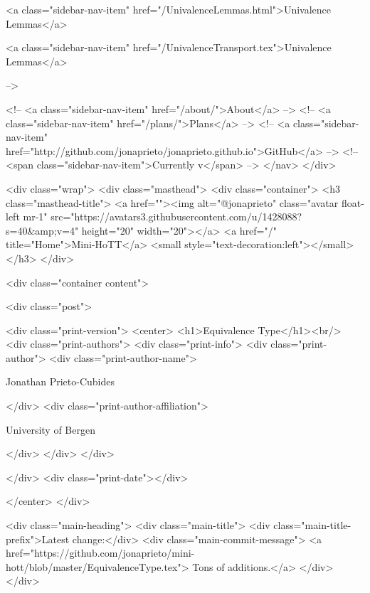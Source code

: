       
    
      
        
          <a class="sidebar-nav-item" href="/UnivalenceLemmas.html">Univalence Lemmas</a>
        
      
    
      
        
          <a class="sidebar-nav-item" href="/UnivalenceTransport.tex">Univalence Lemmas</a>
        
      
     -->

    <!-- <a class="sidebar-nav-item" href="/about/">About</a> -->
    <!-- <a class="sidebar-nav-item" href="/plans/">Plans</a> -->
    <!-- <a class="sidebar-nav-item" href="http://github.com/jonaprieto/jonaprieto.github.io">GitHub</a> -->
    <!-- <span class="sidebar-nav-item">Currently v</span> -->
  </nav>
</div>

    <div class="wrap">
      <div class="masthead">
        <div class="container">
          <h3 class="masthead-title">
            <a href=""><img alt="@jonaprieto" class="avatar float-left mr-1" src="https://avatars3.githubusercontent.com/u/1428088?s=40&amp;v=4" height="20" width="20"></a>
            <a href="/" title="Home">Mini-HoTT</a>
            <small style="text-decoration:left"></small>
          </h3>
        </div>
      
      <div class="container content">
        







<div class="post">

  <div class="print-version">
    <center>
      <h1>Equivalence Type</h1><br/>
        <div class="print-authors">
          <div class="print-info">
            <div class="print-author">
              <div class="print-author-name">
                
                  Jonathan Prieto-Cubides
                
              </div>
              <div class="print-author-affiliation">
                
                  University of Bergen
                
                </div>
            </div>
          </div>
          
          
        </div>
        <div class="print-date"></div>
        
        
    </center>
  </div>

  
  <div class="main-heading">
    <div class="main-title">
      <div class="main-title-prefix">Latest change:</div>
      <div class="main-commit-message">
            <a href="https://github.com/jonaprieto/mini-hott/blob/master/EquivalenceType.tex">
              Tons of additions.</a>
      </div>
    </div>

